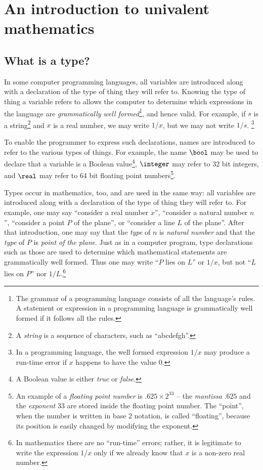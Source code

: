 \chapter{An introduction to univalent mathematics}
\label{ch:univalent-mathematics}

\section{What is a type?}
\label{sec:what-is-a-type}

In some computer programming languages, all variables are introduced along with a declaration of the type of thing they will refer to.  Knowing
the type of thing a variable refers to allows the computer to determine which expressions in the language are \emph{grammatically well
formed}\footnote{The grammar of a programming language consists of all the language's rules.  A statement or expression in a programming
language is grammatically well formed if it follows all the rules.}, and hence valid.  For example, if $s$ is a
string\footnote{A \emph{string} is a sequence of characters, such as ``abcdefgh''.} and $x$ is a real number, we may write $1/x$, but we may not write $1/s$.%
\footnote{In a programming language, the well formed expression $1/x$ may produce a run-time error if $x$ happens to have the value $0$.}

To enable the programmer to express such declarations, names are introduced to refer to the various types of things.  For example, the name
$\bool$ may be used to declare that a variable is a Boolean value\footnote{A Boolean value is either \emph{true} or \emph{false}.},
  $\integer$ may refer to 32 bit integers, and $\real$ may refer to 64 bit floating point numbers\footnote{An example of a \emph{floating
point number} is $.625 \times 2^{33}$ -- the \emph{mantissa} $.625$ and the \emph{exponent} $33$ are stored inside the floating point number.
The ``point'', when the number is written in base $2$ notation, is called ``floating'', because its position is easily changed by modifying the exponent.}.

Types occur in mathematics, too, and are used in the same way: all variables are introduced along with a declaration of the type of thing they
will refer to. For example, one may say ``consider a real number $x$'', ``consider a natural number $n$'', ``consider a point $P$ of
the plane'', or ``consider a line $L$ of the plane''.  After that introduction, one may say that the \emph{type} of $n$ is \emph{natural number} and
that the \emph{type} of $P$ is \emph{point of the
plane}.  Just as in a computer program, type declarations such as those are used to determine which mathematical statements are grammatically
well formed.  Thus one may write ``$P$ lies on $L$'' or $1/x$, but not ``$L$ lies on $P$'' nor $1/L$.\footnote{In mathematics there are no
``run-time'' errors; rather, it is legitimate to write the expression $1/x$ only if we already know that $x$ is a non-zero real number.}

